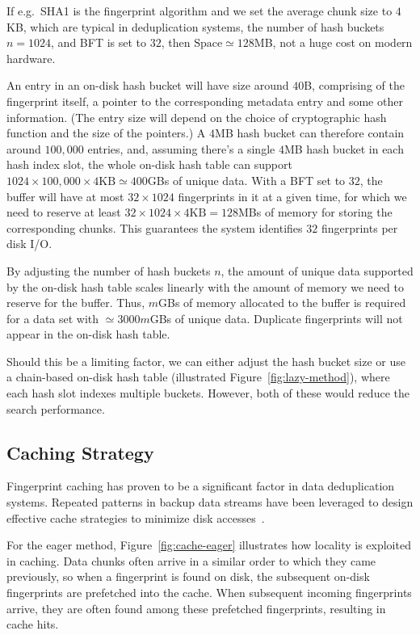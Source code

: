 \documentclass[prodmode,acmtecs]{acmsmall}
\begin{document}
If e.g.\ SHA1 is the fingerprint algorithm and we set the average chunk size to $4$KB, which are typical in deduplication systems, the number of hash buckets $n=1024$, and BFT is set to $32$, then $\mathrm{Space} \simeq 128$MB, not a huge cost on modern hardware.


An entry in an on-disk hash bucket will have size around $40$B, comprising of the fingerprint itself, a pointer to the corresponding metadata entry and some other information. (The entry size will depend on the choice of cryptographic hash function and the size of the pointers.)  A $4$MB hash bucket can therefore contain around $100{,}000$ entries, and, assuming there's a single $4$MB hash bucket in each hash index slot, the whole on-disk hash table can support $1024 \times 100,000 \times 4\text{KB} \simeq 400$GBs of unique data.  With a BFT set to $32$, the buffer will have at most $32 \times 1024$ fingerprints in it at a given time, for which we need to reserve at least $32 \times 1024 \times 4\text{KB}=128$MBs of memory for storing the corresponding chunks. This guarantees the system identifies $32$ fingerprints per disk I/O.

By adjusting the number of hash buckets $n$, the amount of unique data supported by the on-disk hash table scales linearly with the amount of memory we need to reserve for the buffer.  Thus, $m$GBs of memory allocated to the buffer is required for a data set with $\simeq 3000m$GBs of unique data.  Duplicate fingerprints will not appear in the on-disk hash table.

Should this be a limiting factor, we can either adjust the hash bucket size or use a chain-based on-disk hash table (illustrated Figure~\ref{fig:lazy-method}), where each hash slot indexes multiple buckets.  However, both of these would reduce the search performance.


\subsection{Caching Strategy}

Fingerprint caching has proven to be a significant factor in data deduplication systems. Repeated patterns in backup data streams have been leveraged to design effective cache strategies to minimize disk accesses~\cite{bhagwat2009extreme,guo2011building,lillibridge2009sparse,manber1994finding,xia2011silo,zhu2008avoiding}.

For the eager method, Figure~\ref{fig:cache-eager} illustrates how locality is exploited in caching.  Data chunks often arrive in a similar order to which they came previously, so when a fingerprint is found on disk, the subsequent on-disk fingerprints are prefetched into the cache. When subsequent incoming fingerprints arrive, they are often found among these prefetched fingerprints, resulting in cache hits.
\end{document}

